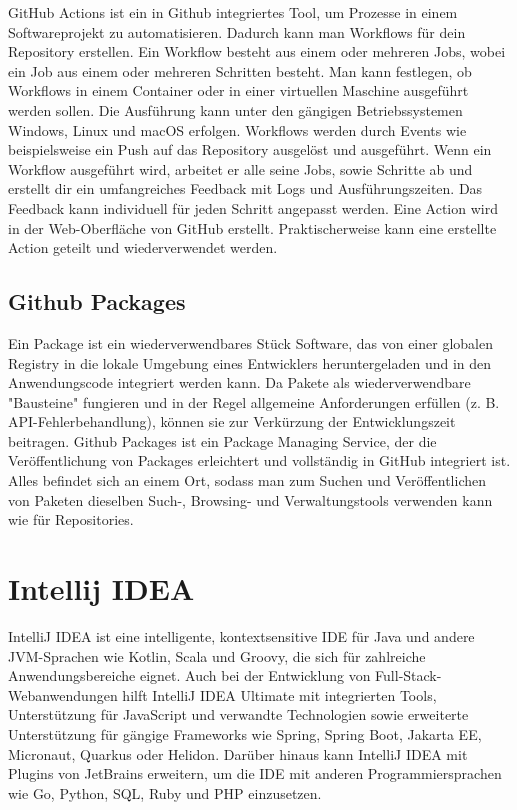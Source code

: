GitHub Actions ist ein in Github integriertes Tool, um Prozesse in einem Softwareprojekt zu automatisieren. 
Dadurch kann man Workflows für dein Repository erstellen. Ein Workflow besteht aus einem oder mehreren Jobs, 
wobei ein Job aus einem oder mehreren Schritten besteht. Man kann festlegen, ob Workflows in einem Container oder in einer virtuellen 
Maschine ausgeführt werden sollen. Die Ausführung kann unter den gängigen Betriebssystemen Windows, Linux und macOS erfolgen. 
Workflows werden durch Events wie beispielsweise ein Push auf das Repository ausgelöst und ausgeführt. Wenn ein Workflow ausgeführt wird, 
arbeitet er alle seine Jobs, sowie Schritte ab und erstellt dir ein umfangreiches Feedback mit Logs und Ausführungszeiten. 
Das Feedback kann individuell für jeden Schritt angepasst werden. Eine Action wird in der Web-Oberfläche von GitHub erstellt. 
Praktischerweise kann eine erstellte Action geteilt und wiederverwendet werden.
\cite{sysarch-github-4}

\subsection{Github Packages}

Ein Package ist ein wiederverwendbares Stück Software, das von einer globalen Registry in die lokale Umgebung eines Entwicklers heruntergeladen und 
in den Anwendungscode integriert werden kann. Da Pakete als wiederverwendbare "Bausteine" fungieren und in der Regel allgemeine Anforderungen erfüllen 
(z. B. API-Fehlerbehandlung), können sie zur Verkürzung der Entwicklungszeit beitragen. Github Packages ist ein Package Managing Service, 
der die Veröffentlichung von Packages erleichtert und vollständig in GitHub integriert ist. Alles befindet sich an einem Ort, 
sodass man zum Suchen und Veröffentlichen von Paketen dieselben Such-, Browsing- und Verwaltungstools verwenden kann wie für Repositories.
\cite{sysarch-github-5}

\section{Intellij IDEA}

IntelliJ IDEA ist eine intelligente, kontextsensitive IDE für Java und andere JVM-Sprachen wie Kotlin, Scala und Groovy, die sich für zahlreiche 
Anwendungsbereiche eignet. Auch bei der Entwicklung von Full-Stack-Webanwendungen hilft IntelliJ IDEA Ultimate mit integrierten Tools, 
Unterstützung für JavaScript und verwandte Technologien sowie erweiterte Unterstützung für gängige Frameworks wie Spring, Spring Boot, Jakarta EE, Micronaut, 
Quarkus oder Helidon. Darüber hinaus kann IntelliJ IDEA mit Plugins von JetBrains erweitern, um die IDE mit anderen Programmiersprachen wie 
Go, Python, SQL, Ruby und PHP einzusetzen. 
\cite{sysarch-intellij-1}

